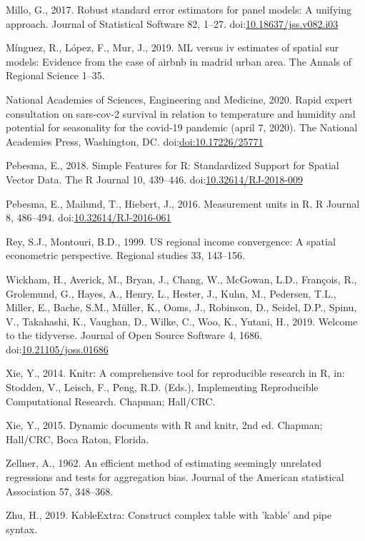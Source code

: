 \documentclass[]{elsarticle} %
\begin{document}
\leavevmode\hypertarget{ref-Millo2017robust}{}%
Millo, G., 2017. Robust standard error estimators for panel models: A
unifying approach. Journal of Statistical Software 82, 1--27.
doi:\href{https://doi.org/10.18637/jss.v082.i03}{10.18637/jss.v082.i03}

\leavevmode\hypertarget{ref-Minguez2019}{}%
Mínguez, R., López, F., Mur, J., 2019. ML versus iv estimates of spatial
sur models: Evidence from the case of airbnb in madrid urban area. The
Annals of Regional Science 1--35.

\leavevmode\hypertarget{ref-National2020rapid}{}%
National Academies of Sciences, Engineering and Medicine, 2020. Rapid
expert consultation on sars-cov-2 survival in relation to temperature
and humidity and potential for seasonality for the covid-19 pandemic
(april 7, 2020). The National Academies Press, Washington, DC.
doi:\href{https://doi.org/doi:10.17226/25771}{doi:10.17226/25771}

\leavevmode\hypertarget{ref-Pebesma2018}{}%
Pebesma, E., 2018. Simple Features for R: Standardized Support for
Spatial Vector Data. The R Journal 10, 439--446.
doi:\href{https://doi.org/10.32614/RJ-2018-009}{10.32614/RJ-2018-009}

\leavevmode\hypertarget{ref-Pebesma2016}{}%
Pebesma, E., Mailund, T., Hiebert, J., 2016. Measurement units in R. R
Journal 8, 486--494.
doi:\href{https://doi.org/10.32614/RJ-2016-061}{10.32614/RJ-2016-061}

\leavevmode\hypertarget{ref-Rey1999us}{}%
Rey, S.J., Montouri, B.D., 1999. US regional income convergence: A
spatial econometric perspective. Regional studies 33, 143--156.

\leavevmode\hypertarget{ref-Wickham2019}{}%
Wickham, H., Averick, M., Bryan, J., Chang, W., McGowan, L.D., François,
R., Grolemund, G., Hayes, A., Henry, L., Hester, J., Kuhn, M., Pedersen,
T.L., Miller, E., Bache, S.M., Müller, K., Ooms, J., Robinson, D.,
Seidel, D.P., Spinu, V., Takahashi, K., Vaughan, D., Wilke, C., Woo, K.,
Yutani, H., 2019. Welcome to the tidyverse. Journal of Open Source
Software 4, 1686.
doi:\href{https://doi.org/10.21105/joss.01686}{10.21105/joss.01686}

\leavevmode\hypertarget{ref-Xie2014}{}%
Xie, Y., 2014. Knitr: A comprehensive tool for reproducible research in
R, in: Stodden, V., Leisch, F., Peng, R.D. (Eds.), Implementing
Reproducible Computational Research. Chapman; Hall/CRC.

\leavevmode\hypertarget{ref-Xie2015}{}%
Xie, Y., 2015. Dynamic documents with R and knitr, 2nd ed. Chapman;
Hall/CRC, Boca Raton, Florida.

\leavevmode\hypertarget{ref-Zellner1962efficient}{}%
Zellner, A., 1962. An efficient method of estimating seemingly unrelated
regressions and tests for aggregation bias. Journal of the American
statistical Association 57, 348--368.

\leavevmode\hypertarget{ref-Zhu2019}{}%
Zhu, H., 2019. KableExtra: Construct complex table with 'kable' and pipe
syntax.
\end{document}
